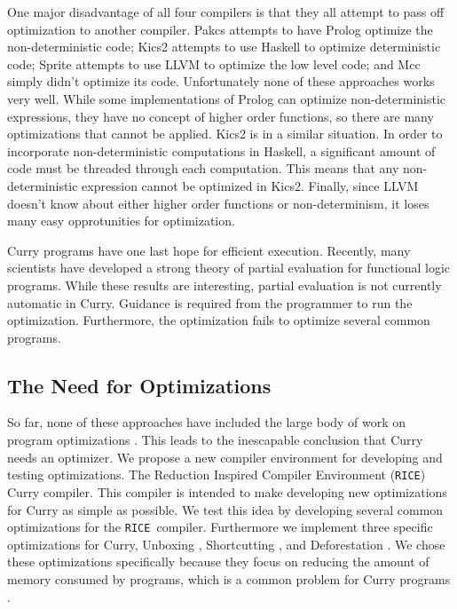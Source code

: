 \documentclass{book}
\newcommand{\rice}{\texttt{RICE}}
\newcommand{\ricesp}{\texttt{RICE }}
\theoremstyle{definition}
\begin{document}
One major disadvantage of all four compilers is that they all
attempt to pass off optimization to another compiler.
Pakcs attempts to have Prolog optimize the non-deterministic code;
Kics2 attempts to use Haskell to optimize
deterministic code; Sprite attempts to use LLVM to optimize the low level code;
and Mcc simply didn't optimize its code.
Unfortunately none of these approaches works very well.
While some implementations of Prolog can optimize non-deterministic expressions,
they have no concept of higher order functions,
so there are many optimizations that cannot be applied.
Kics2 is in a similar situation.  
In order to incorporate non-deterministic computations in Haskell, 
a significant amount of code must be threaded through each computation.
This means that any non-deterministic expression cannot be optimized in Kics2.
Finally, since LLVM doesn't know about either higher order functions or non-determinism,
it loses many easy opprotunities for optimization.

Curry programs have one last hope for efficient execution.
Recently, many scientists \cite{peval, offline_peval} 
have developed a strong theory of partial evaluation for functional logic programs.
While these results are interesting, partial evaluation is not currently automatic in Curry.
Guidance is required from the programmer to run the optimization.
Furthermore, the optimization fails to optimize several common programs.

\subsection{The Need for Optimizations}

So far, none of these approaches have included the large body 
of work on program optimizations
\cite{orbit, dragon, optimizationAllen, dataflowAllen, ssa, compilersAppel, continuationsAppel, 
ANormal, shortcutDeforestation, ultimateGoto, rabbit, lambdaRename, dataflowKildall, dominatorFlow, 
haskellInliner, stg, ssaVariable, deforestationWadler, ssaOptimizations }.
This leads to the inescapable conclusion that Curry needs an optimizer.
We propose a new compiler environment for developing and testing optimizations.
The Reduction Inspired Compiler Environment (\rice) Curry compiler.
This compiler is intended to make developing new optimizations for Curry as simple as possible.
We test this idea by developing several common optimizations for the \ricesp compiler.
Furthermore we implement three specific optimizations for Curry, 
Unboxing \cite{unboxing}, Shortcutting \cite{shortcutting}, and Deforestation \cite{shortcutDeforestation}.
We chose these optimizations specifically because they focus on reducing the amount of memory
consumed by programs, which is a common problem for Curry programs \cite{proposal}.
\end{document}
